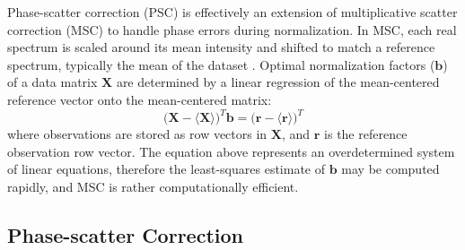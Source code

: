 \begin{doublespace}
Phase-scatter correction (PSC) is effectively an extension of multiplicative
scatter correction (MSC) to handle phase errors during normalization. In MSC,
each real spectrum is scaled around its mean intensity and shifted to match a
reference spectrum, typically the mean of the dataset \cite{fearn:cils2009}.
Optimal normalization factors ($\mathbf{b}$) of a data matrix $\mathbf{X}$ are
determined by a linear regression of the mean-centered reference vector onto
the mean-centered matrix:
\begin{equation}
\big( \mathbf{X} - \langle \mathbf{X} \rangle \big)^T \mathbf{b}
 = \big( \mathbf{r} - \langle \mathbf{r} \rangle \big)^T
\end{equation}
where observations are stored as row vectors in $\mathbf{X}$, and $\mathbf{r}$
is the reference observation row vector. The equation above represents an
overdetermined system of linear equations, therefore the least-squares estimate
of $\mathbf{b}$ may be computed rapidly, and MSC is rather computationally
efficient.
\end{doublespace}

\subsection{Phase-scatter Correction}

